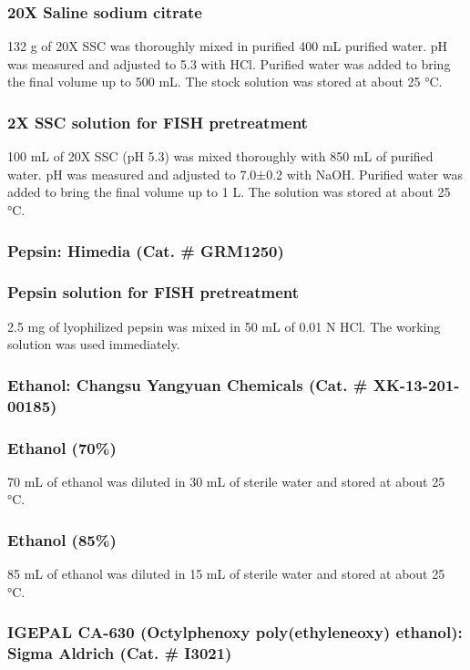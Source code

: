 \begin{refsection}
\subsubsection{20X Saline sodium citrate} 
132 g of 20X SSC was thoroughly mixed in purified 400 mL purified water. pH was measured and adjusted to 5.3 with HCl. Purified water was added to bring the final volume up to 500 mL. The stock solution was stored at about 25 °C. 
\subsubsection{2X SSC solution for FISH pretreatment} 
100 mL of 20X SSC (pH 5.3) was mixed thoroughly with 850 mL of purified water. pH was measured and adjusted to 7.0±0.2 with NaOH. Purified water was added to bring the final volume up to 1 L. The solution was stored at about 25 °C.
\subsubsection{Pepsin: \textmd{Himedia (Cat. \# GRM1250)}}
\subsubsection{Pepsin solution for FISH pretreatment}
2.5 mg of lyophilized pepsin was mixed in 50 mL of 0.01 N HCl. The working solution was used immediately.
\begin{sloppypar}\subsubsection{Ethanol: \textmd{Changsu Yangyuan Chemicals (Cat. \# XK-13-201-00185)}} \end{sloppypar}
\subsubsection{Ethanol (70\%)}
70 mL of ethanol was diluted in 30 mL of sterile water and stored at about 25 °C.
\subsubsection{Ethanol (85\%)}
85 mL of ethanol was diluted in 15 mL of sterile water and stored at about 25 °C.
\begin{sloppypar}\subsubsection{IGEPAL CA-630 (Octylphenoxy poly(ethyleneoxy) ethanol): \textmd{Sigma Aldrich (Cat. \# I3021)}}\end{sloppypar}

\end{refsection}
